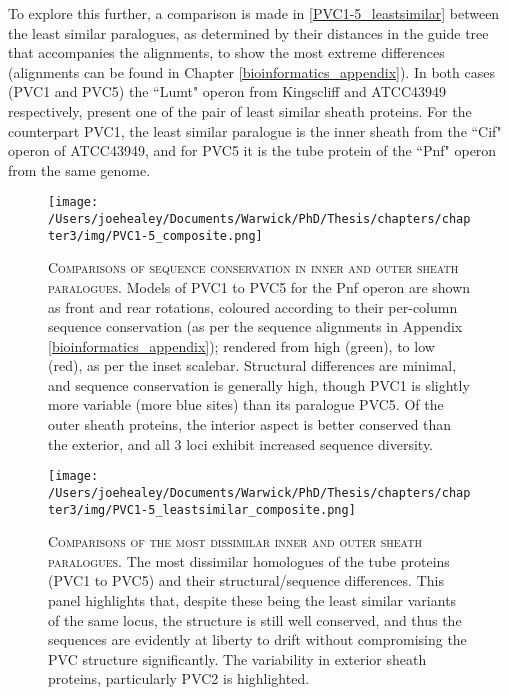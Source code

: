 To explore this further, a comparison is made in \vref{PVC1-5_leastsimilar} between the least similar paralogues, as determined by their distances in the guide tree that accompanies the alignments, to show the most extreme differences (alignments can be found in Chapter \vref{bioinformatics_appendix}). In both cases (PVC1 and PVC5) the ``Lumt" operon from \Pasy{} Kingscliff and ATCC43949 respectively, present one of the pair of least similar sheath proteins. For the counterpart PVC1, the least similar paralogue is the inner sheath from the ``Cif" operon of \Pasy{} ATCC43949, and for PVC5 it is the tube protein of the ``Pnf" operon from the same genome.

\begin{landscape}
\begin{figure}[p]
 \centering
 \texttt{[image: /Users/joehealey/Documents/Warwick/PhD/Thesis/chapters/chapter3/img/PVC1-5\_composite.png]}
 \captionsetup{singlelinecheck=off, justification=justified, font=footnotesize, aboveskip=10pt}
 \caption[PVC1 to PVC5 paralogue conservation comparison]{\textsc{\normalsize Comparisons of sequence conservation in inner and outer sheath paralogues.}\vspace{0.1cm} \newline Models of PVC1 to PVC5 for the Pnf operon are shown as front and rear rotations, coloured according to their per-column sequence conservation (as per the sequence alignments in Appendix \ref{bioinformatics_appendix}); rendered from high (green), to low (red), as per the inset scalebar. Structural differences are minimal, and sequence conservation is generally high, though PVC1 is slightly more variable (more blue sites) than its paralogue PVC5. Of the outer sheath proteins, the interior aspect is better conserved than the exterior, and all 3 loci exhibit increased sequence diversity.}
	\label{PVC1-5_conservation}
\end{figure}

\begin{figure}[p]
 \centering
  \texttt{[image: /Users/joehealey/Documents/Warwick/PhD/Thesis/chapters/chapter3/img/PVC1-5\_leastsimilar\_composite.png]}
 \captionsetup{singlelinecheck=off, justification=justified, font=footnotesize, aboveskip=10pt}
 \caption[Comparisons of the most dissimilar tube proteins]{\textsc{\normalsize Comparisons of the most dissimilar inner and outer sheath paralogues.}\vspace{0.1cm} \newline The most dissimilar homologues of the tube proteins (PVC1 to PVC5) and their structural/sequence differences. This panel highlights that, despite these being the least similar variants of the same locus, the structure is still well conserved, and thus the sequences are evidently at liberty to drift without compromising the PVC structure significantly. The variability in exterior sheath proteins, particularly PVC2 is highlighted.}
 \label{PVC1-5_leastsimilar}
\end{figure}
\end{landscape}



